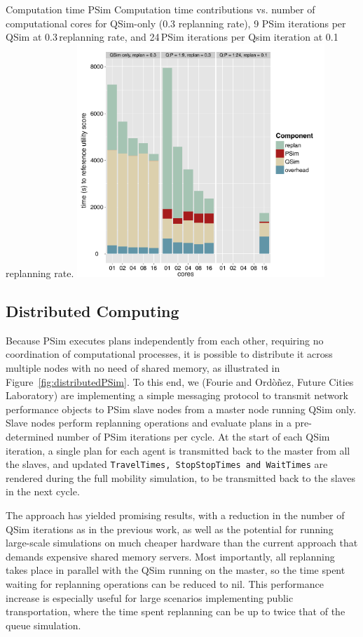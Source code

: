\createfigure%
{Computation time PSim}%
{Computation time contributions vs. number of computational cores for QSim-only (0.3 replanning rate), 9 PSim iterations per QSim at 0.3\,replanning rate, and 24\,PSim iterations per Qsim iteration at 0.1\,replanning rate.}%
{\label{fig:PSimPerformance}}%
{\includegraphics[width=0.7\textwidth, angle=0]{extending/figures/PSim/times}}%
{}

\subsection{Distributed Computing}
Because PSim executes plans independently from each other, requiring no coordination of computational processes, it is possible to distribute it across multiple nodes with no need of shared memory, as illustrated in Figure~\ref{fig:distributedPSim}. To this end, we (Fourie and Ord\`o\~nez, Future Cities Laboratory) are implementing a simple messaging protocol to transmit network performance objects to PSim slave nodes from a master node running QSim only. Slave nodes perform replanning operations and evaluate plans in a pre-determined number of PSim iterations per cycle. At the start of each QSim iteration, a single plan for each agent is transmitted back to the master from all the slaves, and updated \lstinline|TravelTimes, StopStopTimes and WaitTimes| are rendered during the full mobility simulation, to be transmitted back to the slaves in the next cycle.

The approach has yielded promising results, with a reduction in the number of QSim iterations as in the previous work, as well as the potential for running large-scale simulations on much cheaper hardware than the current approach that demands expensive shared memory servers. Most importantly, all replanning takes place in parallel with the QSim running on the master, so the time spent waiting for replanning operations can be reduced to nil. This performance increase is especially useful for large scenarios implementing public transportation, where the time spent replanning can be up to twice that of the queue simulation.

